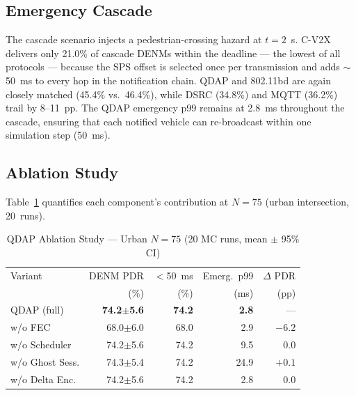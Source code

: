 \documentclass[journal]{IEEEtran}
\begin{document}
\subsection{Emergency Cascade}

The cascade scenario injects a pedestrian-crossing hazard at $t{=}2$~s.
C-V2X delivers only 21.0\% of cascade DENMs within the deadline —
the lowest of all protocols — because the SPS offset is selected once per
transmission and adds $\sim$50~ms to every hop in the notification chain.
QDAP and 802.11bd are again closely matched (45.4\% vs.\ 46.4\%),
while DSRC (34.8\%) and MQTT (36.2\%) trail by 8–11~pp.
The QDAP emergency p99 remains at \SI{2.8}{\milli\second} throughout the
cascade, ensuring that each notified vehicle can re-broadcast within
one simulation step (\SI{50}{\milli\second}).

\subsection{Ablation Study}

Table~\ref{tab:ablation} quantifies each component's contribution at
$N{=}75$ (urban intersection, 20~runs).

\begin{table}[htbp]
\centering
\caption{QDAP Ablation Study — Urban $N{=}75$ (20 MC runs, mean $\pm$ 95\% CI)}
\label{tab:ablation}
\begin{tabular}{lrrrr}
\toprule
Variant          & DENM PDR       & $<$50~ms & Emerg.~p99 & $\Delta$ PDR \\
                 & (\%)           & (\%)     & (ms)       & (pp)\\
\midrule
QDAP (full)      & \textbf{74.2$\pm$5.6} & \textbf{74.2} & \textbf{2.8}  & —      \\
w/o FEC          & 68.0$\pm$6.0   & 68.0     & 2.9        & $-6.2$ \\
w/o Scheduler    & 74.2$\pm$5.6   & 74.2     & 9.5        & 0.0    \\
w/o Ghost Sess.  & 74.3$\pm$5.4   & 74.2     & 24.9       & $+0.1$ \\
w/o Delta Enc.   & 74.2$\pm$5.6   & 74.2     & 2.8        & 0.0    \\
\bottomrule
\end{tabular}
\end{table}
\end{document}
